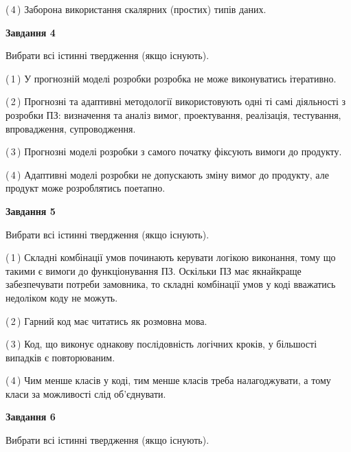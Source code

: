\documentclass[10pt, ukrainian]{article}
\begin{document}
{\begin {large}
(\,4\,) Заборона використання скалярних (простих) типів даних. %


{\begin {center}\textbf{Завдання 4}\end {center}}\par
Вибрати всі істинні твердження (якщо існують).\par
\vspace{2mm}



(\,1\,) У прогнозній моделі розробки розробка не може виконуватись ітеративно. %



(\,2\,) Прогнозні та адаптивні методології використовують одні ті самі діяльності з розробки ПЗ: визначення та аналіз вимог, проектування, реалізація, тестування, впровадження, супроводження. %



(\,3\,) Прогнозні моделі розробки з самого початку фіксують вимоги до продукту. %



(\,4\,) Адаптивні моделі розробки не допускають зміну вимог до продукту, але продукт може розроблятись поетапно. %


{\begin {center}\textbf{Завдання 5}\end {center}}\par
Вибрати всі істинні твердження (якщо існують).\par
\vspace{2mm}



(\,1\,) Складні комбінації умов починають керувати логікою виконання, тому що такими є вимоги до функціонування ПЗ. Оскільки ПЗ має якнайкраще забезпечувати потреби замовника, то складні комбінації умов у коді вважатись недоліком коду не можуть. %



(\,2\,) Гарний код має читатись як розмовна мова. %



(\,3\,) Код, що виконує однакову послідовність логічних кроків, у більшості випадків є повторюваним.%



(\,4\,) Чим менше класів у коді, тим менше класів треба налагоджувати, а тому класи за можливості слід об'єднувати. %

\newpage

{\begin {center}\textbf{Завдання 6}\end {center}}\par
Вибрати всі істинні твердження (якщо існують).\par
\vspace{2mm}




\end{large}}
\end{document}
